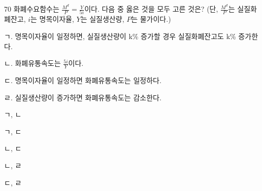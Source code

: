 \begin{question}{70}
화폐수요함수는 $\frac{M^{d}}{P}=\frac{Y}{5i}$이다. 다음 중 옳은 것을 모두 고른 것은? (단, $\frac{M^{d}}{P}$는 실질화폐잔고, $i$는 명목이자율, $Y$는 실질생산량, $P$는 물가이다.)
\begin{framedtext}
ㄱ. 명목이자율이 일정하면, 실질생산량이 k\% 증가할 경우 실질화폐잔고도 k\% 증가한다. \par
ㄴ. 화폐유통속도는 $\frac{5i}{Y}$이다. \par
ㄷ. 명목이자율이 일정하면 화폐유통속도는 일정하다. \par
ㄹ. 실질생산량이 증가하면 화폐유통속도는 감소한다.
\end{framedtext}
\begin{choices}
  \item ㄱ, ㄴ
  \item ㄱ, ㄷ
  \item ㄴ, ㄷ
  \item ㄴ, ㄹ
  \item ㄷ, ㄹ
\end{choices}
\end{question}
